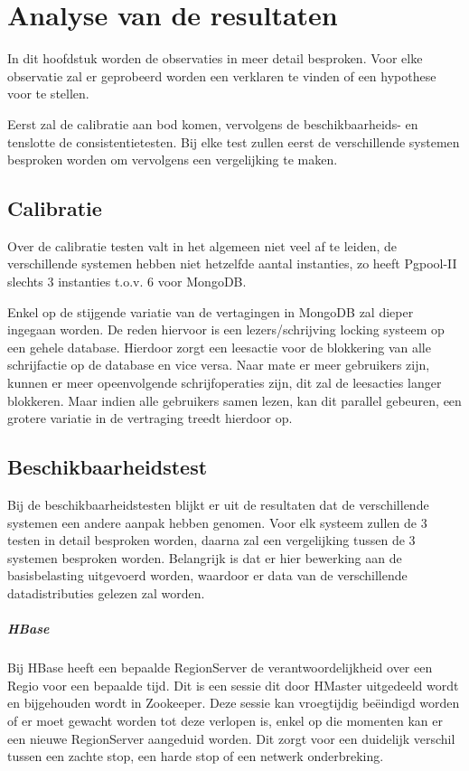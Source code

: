 \chapter{Analyse van de resultaten}\label{sec:analyse}
In dit hoofdstuk worden de observaties in meer detail besproken. Voor elke observatie zal er geprobeerd worden een verklaren te vinden of een hypothese voor te stellen. 

Eerst zal de calibratie aan bod komen, vervolgens de beschikbaarheids- en tenslotte de consistentietesten. Bij elke test zullen eerst de verschillende systemen besproken worden om vervolgens een vergelijking te maken. 

\section{Calibratie}
Over de calibratie testen valt in het algemeen niet veel af te leiden, de verschillende systemen hebben niet hetzelfde aantal instanties, zo heeft Pgpool-II slechts 3 instanties t.o.v. 6 voor MongoDB. 

Enkel op de stijgende variatie van de vertagingen in MongoDB zal dieper ingegaan worden. De reden hiervoor is een lezers/schrijving locking systeem op een gehele database\cite{mongodb-concurrency}. Hierdoor zorgt een leesactie voor de blokkering van alle schrijfactie op de database en vice versa. Naar mate er meer gebruikers zijn, kunnen er meer opeenvolgende schrijfoperaties zijn, dit zal de leesacties langer blokkeren. Maar indien alle gebruikers samen lezen, kan dit parallel gebeuren, een grotere variatie in de vertraging treedt hierdoor op. 

\section{Beschikbaarheidstest}
Bij de beschikbaarheidstesten blijkt er uit de resultaten dat de verschillende systemen een andere aanpak hebben genomen. Voor elk systeem zullen de 3 testen in detail besproken worden, daarna zal een vergelijking tussen de 3 systemen besproken worden. Belangrijk  is dat er hier bewerking aan de basisbelasting uitgevoerd worden, waardoor er data van de verschillende datadistributies gelezen zal worden. 

\paragraph{HBase} Bij HBase heeft een bepaalde RegionServer de verantwoordelijkheid over een Regio voor een bepaalde tijd. Dit is een sessie dit door HMaster uitgedeeld wordt en bijgehouden wordt in Zookeeper. Deze sessie kan vroegtijdig beëindigd worden of er moet gewacht worden tot deze verlopen is, enkel op die momenten kan er een nieuwe RegionServer aangeduid worden. Dit zorgt voor een duidelijk verschil tussen een zachte stop, een harde stop of een netwerk onderbreking. 

